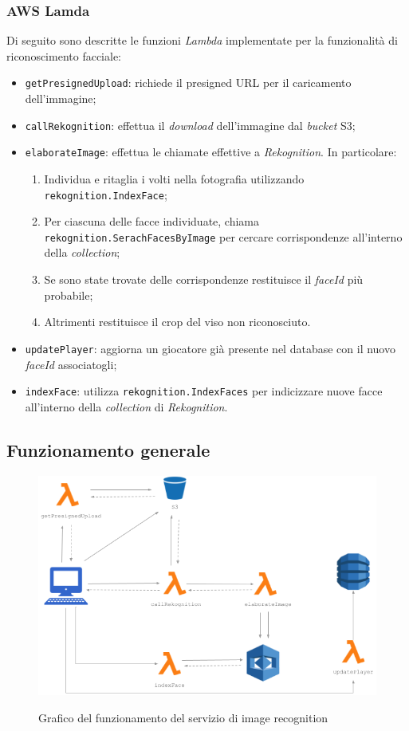 	\subsubsection{AWS Lamda}
	Di seguito sono descritte le funzioni \emph{Lambda} implementate per la funzionalità di riconoscimento facciale:
	\begin{itemize}
		\item \texttt{getPresignedUpload}: richiede il presigned URL per il caricamento dell'immagine;
		\item \texttt{callRekognition}: effettua il \emph{download} dell'immagine dal \emph{bucket} S3;
		\item \texttt{elaborateImage}: effettua le chiamate effettive a \emph{Rekognition}. In particolare:
			\begin{enumerate}
				\item Individua e ritaglia i volti nella fotografia utilizzando \texttt{rekognition.IndexFace};
				\item Per ciascuna delle facce individuate, chiama \texttt{rekognition.SerachFacesByImage} per cercare corrispondenze all'interno della \emph{collection};
				\item Se sono state trovate delle corrispondenze restituisce il \emph{faceId} più probabile;
				\item Altrimenti restituisce il crop del viso non riconosciuto.
			\end{enumerate}
		\item \texttt{updatePlayer}: aggiorna un giocatore già presente nel database con il nuovo \emph{faceId} associatogli;
		\item \texttt{indexFace}: utilizza \texttt{rekognition.IndexFaces} per indicizzare nuove facce all'interno della \emph{collection} di \emph{Rekognition}.
	\end{itemize}
	
	
	
	\subsection{Funzionamento generale}
	
	\begin{figure}[H]
		\centering
		\includegraphics[width=12cm]{immagini/funzionamento.png} \\
		\caption{\label{fig:funzionamento-rek} Grafico del funzionamento del servizio di image recognition}
	\end{figure}


